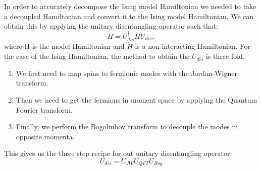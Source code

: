 \documentclass[12pt]{article}
\begin{document}
  In order to accurately decompose the Ising model Hamiltonian we needed to take a decoupled Hamiltonian and convert it to the Ising model Hamiltonian. We can obtain this by applying the unitary disentangling operator such that:
  \begin{equation}
    \tilde{H} = U_{dis}^{\dagger}HU_{dis},
  \end{equation}
  where H is the model Hamiltonian and $\tilde{H}$ is a non interacting Hamiltonian. For the case of the Ising Hamiltonian, the method to obtain the $U_{dis}$ is three fold. 
  \begin{enumerate}
   \item We first need to map spins to fermionic modes with the Jordan-Wigner transform. 
   \item Then we need to get the fermions in moment space by applying the Quantum Fourier transform. 
   \item Finally, we perform the Bogoliubov transform to decouple the modes in opposite momenta. 
  \end{enumerate}
  This gives us the three step recipe for out unitary disentangling operator:
  \begin{equation}
    U_{dis} = U_{JW}U_{QFT}U_{Bog}
  \end{equation}
\end{document}
